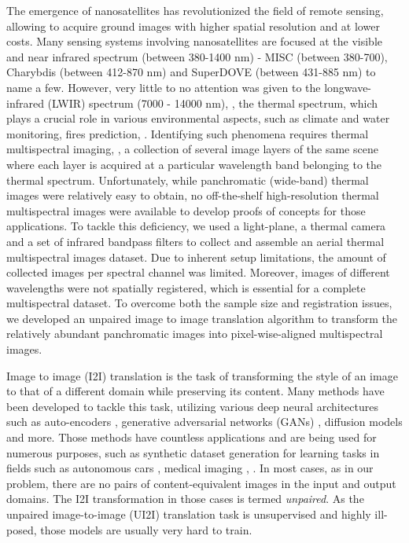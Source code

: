 
The emergence of nanosatellites has revolutionized the field of remote sensing, allowing to acquire ground images with higher spatial resolution and at lower costs.
Many sensing systems involving nanosatellites are focused at the visible and near infrared spectrum (between 380-1400 nm) - MISC \cite{kalman2008misc} (between 380-700), Charybdis \cite{lowe2012charybdis} (between 412-870 nm) and SuperDOVE \cite{tu2022radiometric} (between 431-885 nm) to name a few.
However, very little to no attention was given to the longwave-infrared (LWIR) spectrum (7000 - 14000 nm), \aka, the thermal spectrum, which plays a crucial role in various environmental aspects, such as climate and water monitoring, fires prediction, \etc.
Identifying such phenomena requires thermal multispectral imaging, \ie, a collection of several image layers of the same scene where each layer is acquired at a particular wavelength band belonging to the thermal spectrum.
Unfortunately, while panchromatic (wide-band) thermal images were relatively easy to obtain, no off-the-shelf high-resolution thermal multispectral images were available to develop proofs of concepts for those applications.
To tackle this deficiency, we used a light-plane, a thermal camera and a set of infrared bandpass filters to collect and assemble an aerial thermal multispectral images dataset.
Due to inherent setup limitations, the amount of collected images per spectral channel was limited.
Moreover, images of different wavelengths were not spatially registered, which is essential for a complete multispectral dataset.
To overcome both the sample size and registration issues, we developed an unpaired image to image translation algorithm to transform the relatively abundant panchromatic images into pixel-wise-aligned multispectral images.

Image to image (I2I) translation is the task of transforming the style of an image to that of a different domain while preserving its content.
Many methods have been developed to tackle this task, utilizing various deep neural architectures such as auto-encoders \cite{zhao2021unpaired}, generative adversarial networks (GANs) \cite{CycleGAN2017, park2020cut, zhao2020unpaired}, diffusion models \cite{DBLP:journals/corr/abs-2104-05358, saharia2022palette} and more.
Those methods have countless applications and are being used for numerous purposes, such as synthetic dataset generation for learning tasks in fields such as autonomous cars \cite{https://doi.org/10.48550/arxiv.1812.01710, Dundar2018DomainSA}, medical imaging \cite{Thambawita_2022, chen2021synthetic}, \etc.
In most cases, as in our problem, there are no pairs of content-equivalent images in the input and output domains.
The I2I transformation in those cases is termed \emph{unpaired}.
As the unpaired image-to-image (UI2I) translation task is unsupervised and highly ill-posed, those models are usually very hard to train.

